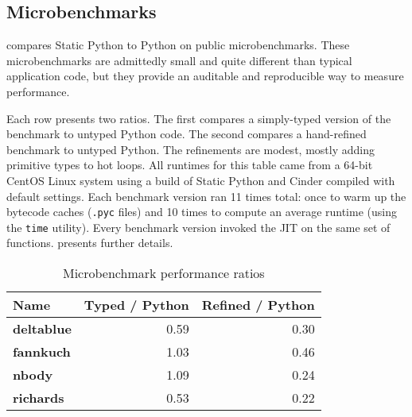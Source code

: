 \documentclass[english,cleveref,submission]{programming}
\newcommand{\SP}{Static Python}
\newcommand{\code}[1]{\texttt{#1}}
\newcommand{\numbenchmark}{3}
\newcommand{\bmname}[1]{\textbf{#1}}
\begin{document}
%
%


\subsection{Microbenchmarks}
\label{s:microbenchmarks}

 compares \SP{} to Python on public microbenchmarks.
These microbenchmarks are admittedly small and quite different than typical application code,
but they provide an auditable and reproducible way to measure performance.

Each row presents two ratios.
The first compares a simply-typed version of the benchmark to untyped Python code.
The second compares a hand-refined benchmark to untyped Python.
The refinements are modest, mostly adding primitive types to hot loops.
All runtimes for this table came from a 64-bit CentOS Linux system using a build
of \SP{} and Cinder compiled with default settings.
Each benchmark version ran 11 times total: once to warm up the bytecode caches
(\code{.pyc} files) and 10 times to compute an average runtime (using the
\code{time} utility).
Every benchmark version invoked the JIT on the same set of functions.
 presents further details.

\begin{table}[t]
  \caption{Microbenchmark performance ratios}
  \label{t:microbenchmark}

  \centering
  \begin{tabular}{lrr}
    Name               & Typed / Python & Refined / Python \\\midrule
    \bmname{deltablue} &         0.59 &           0.30 \\
    \bmname{fannkuch}  &         1.03 &           0.46 \\
    \bmname{nbody}     &         1.09 &           0.24 \\
    \bmname{richards}  &         0.53 &           0.22
  \end{tabular}

\end{table}
\end{document}
